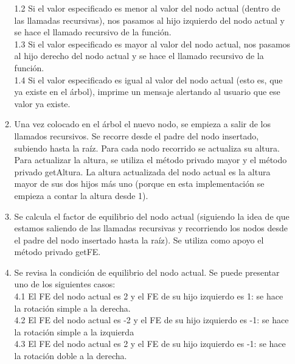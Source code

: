 \documentclass{article}
\begin{document}
\begin{itemize}
\begin{enumerate}
            1.2 Si el valor especificado es menor al valor del nodo actual (dentro de las llamadas recursivas), nos pasamos al hijo izquierdo del nodo actual y se hace el llamado recursivo de la función.\\

            1.3 Si el valor especificado es mayor al valor del nodo actual, nos pasamos al hijo derecho del nodo actual y se hace el llamado recursivo de la función.\\
            
            1.4 Si el valor especificado es igual al valor del nodo actual (esto es, que ya existe en el árbol), imprime un mensaje alertando al usuario que ese valor ya existe.\\
\item Una vez colocado en el árbol el nuevo nodo, se empieza a salir de los llamados recursivos. Se recorre desde el padre del nodo insertado, subiendo hasta la raíz. Para cada nodo recorrido se actualiza su altura. Para actualizar la altura, se utiliza el método privado mayor y el método privado getAltura. La altura actualizada del nodo actual es la altura mayor de sus dos hijos más uno (porque en esta implementación se empieza a contar la altura desde 1).
\item Se calcula el factor de equilibrio del nodo actual (siguiendo la idea de que estamos saliendo de las llamadas recursivas y recorriendo los nodos desde el padre del nodo insertado hasta la raíz). Se utiliza como apoyo el método privado getFE.
\item Se revisa la condición de equilibrio del nodo actual. Se puede presentar uno de los siguientes casos:\\

            4.1 El FE del nodo actual es 2 y el FE de su hijo izquierdo es 1: se hace la rotación simple a la derecha. \\
            
            4.2 El FE del nodo actual es -2 y el FE de su hijo izquierdo es -1: se hace la rotación simple a la izquierda \\

            4.3 El FE del nodo actual es 2 y el FE de su hijo izquierdo es -1: se hace la rotación doble a la derecha.\\
            

\end{enumerate}
\end{itemize}
\end{document}
